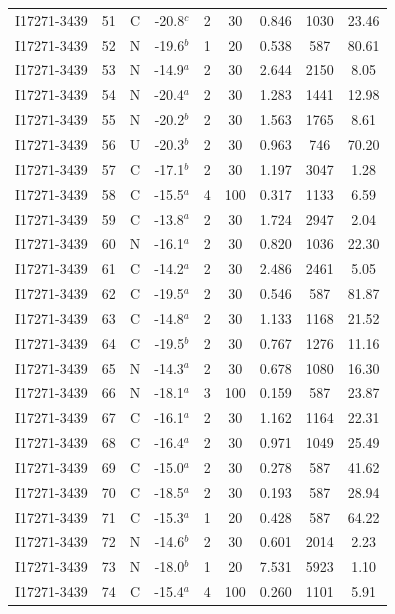 \begin{table}
\begin{tabular}{ccccccccc}
I17271-3439 & 51 & C & -20.8$^{c}$ & 2 & 30 & 0.846 & 1030 & 23.46 \\
I17271-3439 & 52 & N & -19.6$^{b}$ & 1 & 20 & 0.538 & 587 & 80.61 \\
I17271-3439 & 53 & N & -14.9$^{a}$ & 2 & 30 & 2.644 & 2150 & 8.05 \\
I17271-3439 & 54 & N & -20.4$^{a}$ & 2 & 30 & 1.283 & 1441 & 12.98 \\
I17271-3439 & 55 & N & -20.2$^{b}$ & 2 & 30 & 1.563 & 1765 & 8.61 \\
I17271-3439 & 56 & U & -20.3$^{b}$ & 2 & 30 & 0.963 & 746 & 70.20 \\
I17271-3439 & 57 & C & -17.1$^{b}$ & 2 & 30 & 1.197 & 3047 & 1.28 \\
I17271-3439 & 58 & C & -15.5$^{a}$ & 4 & 100 & 0.317 & 1133 & 6.59 \\
I17271-3439 & 59 & C & -13.8$^{a}$ & 2 & 30 & 1.724 & 2947 & 2.04 \\
I17271-3439 & 60 & N & -16.1$^{a}$ & 2 & 30 & 0.820 & 1036 & 22.30 \\
I17271-3439 & 61 & C & -14.2$^{a}$ & 2 & 30 & 2.486 & 2461 & 5.05 \\
I17271-3439 & 62 & C & -19.5$^{a}$ & 2 & 30 & 0.546 & 587 & 81.87 \\
I17271-3439 & 63 & C & -14.8$^{a}$ & 2 & 30 & 1.133 & 1168 & 21.52 \\
I17271-3439 & 64 & C & -19.5$^{b}$ & 2 & 30 & 0.767 & 1276 & 11.16 \\
I17271-3439 & 65 & N & -14.3$^{a}$ & 2 & 30 & 0.678 & 1080 & 16.30 \\
I17271-3439 & 66 & N & -18.1$^{a}$ & 3 & 100 & 0.159 & 587 & 23.87 \\
I17271-3439 & 67 & C & -16.1$^{a}$ & 2 & 30 & 1.162 & 1164 & 22.31 \\
I17271-3439 & 68 & C & -16.4$^{a}$ & 2 & 30 & 0.971 & 1049 & 25.49 \\
I17271-3439 & 69 & C & -15.0$^{a}$ & 2 & 30 & 0.278 & 587 & 41.62 \\
I17271-3439 & 70 & C & -18.5$^{a}$ & 2 & 30 & 0.193 & 587 & 28.94 \\
I17271-3439 & 71 & C & -15.3$^{a}$ & 1 & 20 & 0.428 & 587 & 64.22 \\
I17271-3439 & 72 & N & -14.6$^{b}$ & 2 & 30 & 0.601 & 2014 & 2.23 \\
I17271-3439 & 73 & N & -18.0$^{b}$ & 1 & 20 & 7.531 & 5923 & 1.10 \\
I17271-3439 & 74 & C & -15.4$^{a}$ & 4 & 100 & 0.260 & 1101 & 5.91 \\

\end{tabular}
\end{table}
